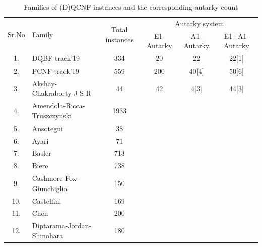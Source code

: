 \documentclass[runningheads]{llncs}
\begin{document}
\begin{table}
\caption{Families of (D)QCNF instances and the corresponding autarky count}\label{tab:aut-count}
\begin{tabular}{c|l|c|c|c|c}

\hline
   \multirow{2}{1cm}{Sr.No} &  \multirow{2}{3cm}{Family} &  \multirow{2}{2cm}{Total instances} & \multicolumn{3}{c}{Autarky system} \\
    \cline{4-6}
  & & & E1-Autarky & A1-Autarky & E1+A1-Autarky \\
    
\hline

1. & DQBF-track'19 &  334 & 20 & 22 & 22[1] \\ \hline
2. & PCNF-track'19 &  559 & 200 & 40[4] & 50[6] \\ \hline
3. & Akshay-Chakraborty-J-S-R &  44 & 42 & 4[3] & 44[3] \\ \hline
4. & Amendola-Ricca-Truszczynski & 1933 & &  &  \\ \hline

5. & Ansotegui &  38 & &  &  \\ \hline

6. & Ayari &  71 &  &  &  \\ \hline

7. & Basler &  713 & & &  \\ \hline

8. & Biere &  738 & &  &  \\ \hline

9. & Cashmore-Fox-Giunchiglia &  150 &  &  &  \\ \hline 

10. & Castellini &  169 & &  &  \\ \hline

11. & Chen &  200 &  &  &  \\ \hline

12. & Diptarama-Jordan-Shinohara &  180 &  &  &  \\ \hline


\end{tabular}
\end{table}
\end{document}
